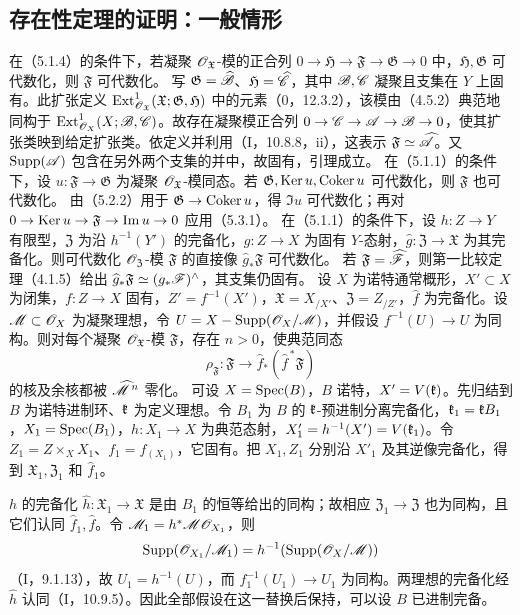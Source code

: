 \subsection{存在性定理的证明：一般情形}
在（5.1.4）的条件下，若凝聚 $\mathscr O_{\mathfrak X}$-模的正合列 $0\to\mathfrak H\to\mathfrak F\to\mathfrak G\to0$ 中，$\mathfrak H,\mathfrak G$ 可代数化，则 $\mathfrak F$ 可代数化。
\eproof
写 $\mathfrak G=\widehat{\mathscr B}$、$\mathfrak H=\widehat{\mathscr C}$，其中 $\mathscr B,\mathscr C$ 凝聚且支集在 $Y$ 上固有。此扩张定义 $\operatorname{Ext}^1_{\mathscr O_{\mathfrak X}}(\mathfrak X;\mathfrak G,\mathfrak H)$ 中的元素（0，12.3.2），该模由（4.5.2）典范地同构于 $\operatorname{Ext}^1_{\mathscr O_X}(X;\mathscr B,\mathscr C)$。故存在凝聚模正合列 $0\to\mathscr C\to\mathscr A\to\mathscr B\to0$，使其扩张类映到给定扩张类。依定义并利用（I，10.8.8，ii），这表示 $\mathfrak F\simeq\widehat{\mathscr A}$。又 $\operatorname{Supp}(\mathscr A)$ 包含在另外两个支集的并中，故固有，引理成立。\finishproof
{}
在（5.1.1）的条件下，设 $u:\mathfrak F\to\mathfrak G$ 为凝聚 $\mathscr O_{\mathfrak X}$-模同态。若 $\mathfrak G,\operatorname{Ker} u,\operatorname{Coker} u$ 可代数化，则 $\mathfrak F$ 也可代数化。
\eproof
由（5.2.2）用于 $\mathfrak G\to\operatorname{Coker} u$，得 $\Im u$ 可代数化；再对 $0\to\operatorname{Ker} u\to\mathfrak F\to\operatorname{Im} u\to0$ 应用（5.3.1）。\finishproof
{}
在（5.1.1）的条件下，设 $h:Z\to Y$ 有限型，$\mathfrak Z$ 为沿 $h^{-1}(Y')$ 的完备化，$g:Z\to X$ 为固有 $Y$-态射，$\widehat g:\mathfrak Z\to\mathfrak X$ 为其完备化。则可代数化 $\mathscr O_{\mathfrak Z}$-模 $\mathfrak F$ 的直接像 $\widehat g_*\mathfrak F$ 可代数化。
\eproof
若 $\mathfrak F=\widehat{\mathscr F}$，则第一比较定理（4.1.5）给出 $\widehat g_*\mathfrak F\simeq(g_*\mathscr F)^\wedge$，其支集仍固有。\finishproof
{}
设 $X$ 为诺特通常概形，$X'\subset X$ 为闭集，$f:Z\to X$ 固有，$Z'=f^{-1}(X')$，$\mathfrak X=X_{/X'}$、$\mathfrak Z=Z_{/Z'}$，$\widehat f$ 为完备化。设 $\mathscr M\subset\mathscr O_X$ 为凝聚理想，令 $U=X-\operatorname{Supp}(\mathscr O_X/\mathscr M)$，并假设 $f^{-1}(U)\to U$ 为同构。则对每个凝聚 $\mathscr O_{\mathfrak X}$-模 $\mathfrak F$，存在 $n>0$，使典范同态
\[
\rho_{\mathfrak F}:\mathfrak F\longrightarrow
\widehat f_*(\widehat f^{\,*}\mathfrak F)
\]
的核及余核都被 $\widehat{\mathscr M}^{\,n}$ 零化。
\eproof
可设 $X=\operatorname{Spec}(B)$，$B$ 诺特，$X'=V(\mathfrak k)$。先归结到 $B$ 为诺特进制环、$\mathfrak k$ 为定义理想。令 $B_1$ 为 $B$ 的 $\mathfrak k$-预进制分离完备化，$\mathfrak k_1=\mathfrak k B_1$，$X_1=\operatorname{Spec}(B_1)$，$h:X_1\to X$ 为典范态射，$X'_1=h^{-1}(X')=V(\mathfrak k_1)$。令 $Z_1=Z\times_XX_1$、$f_1=f_{(X_1)}$，它固有。把 $X_1,Z_1$ 分别沿 $X'_1$ 及其逆像完备化，得到 $\mathfrak X_1,\mathfrak Z_1$ 和 $\widehat f_1$。

$h$ 的完备化 $\widehat h:\mathfrak X_1\to\mathfrak X$ 是由 $B_1$ 的恒等给出的同构；故相应 $\mathfrak Z_1\to\mathfrak Z$ 也为同构，且它们认同 $\widehat f_1,\widehat f$。令 $\mathscr M_1=h^*\mathscr M\mathscr O_{X_1}$，则
\[
\operatorname{Supp}(\mathscr O_{X_1}/\mathscr M_1)=h^{-1}(\operatorname{Supp}(\mathscr O_X/\mathscr M))
\]
（I，9.1.13），故 $U_1=h^{-1}(U)$，而 $f_1^{-1}(U_1)\to U_1$ 为同构。两理想的完备化经 $\widehat h$ 认同（I，10.9.5）。因此全部假设在这一替换后保持，可以设 $B$ 已进制完备。

